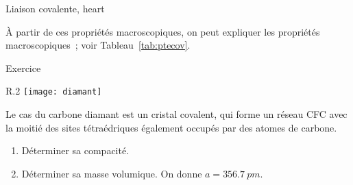 \documentclass[../main/main.tex]{subfiles}
\begin{document}
\begin{tprop}{Liaison covalente, heart}
\end{tprop}

À partir de ces propriétés macroscopiques, on peut expliquer les propriétés
macroscopiques~; voir Tableau~\ref{tab:ptecov}.

\begin{rexem}{Exercice}
  \begin{wrapfigure}[4]{R}{.2\linewidth}
    \vspace*{-20pt}
    \centering
    \texttt{[image: diamant]}
  \end{wrapfigure}
  Le cas du carbone diamant est un cristal covalent, qui forme un réseau CFC
  avec la moitié des sites tétraédriques également occupés par des atomes de
  carbone.
  \begin{enumerate}
    \item Déterminer sa compacité.
    \item Déterminer sa masse volumique. On donne $a = \SI{356.7}{pm}$.
  \end{enumerate}
  \tcblower
  \vspace{20pt}
  \vspace{20pt}
\end{rexem}
\end{document}
